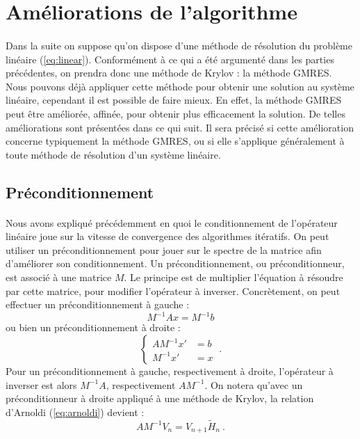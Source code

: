 \section{Améliorations de l’algorithme}

	\paragraph{}
	Dans la suite on suppose qu'on dispose d'une méthode de résolution du problème linéaire (\ref{eq:linear}).
	Conformément à ce qui a été argumenté dans les parties précédentes, on prendra donc une méthode de Krylov : la méthode GMRES.
	Nous pouvons déjà appliquer cette méthode pour obtenir une solution au système linéaire, cependant il est possible de faire mieux.
	En effet, la méthode GMRES peut être améliorée, affinée, pour obtenir plus efficacement la solution.
	De telles améliorations sont présentées dans ce qui suit.
	Il sera précisé si cette amélioration concerne typiquement la méthode GMRES, ou si elle s'applique généralement à toute méthode de résolution d'un système linéaire.


	\subsection{Préconditionnement}

		\paragraph{}
		Nous avons expliqué précédemment en quoi le conditionnement de l'opérateur linéaire joue sur la vitesse de convergence des algorithmes itératifs.
		On peut utiliser un préconditionnement pour jouer sur le spectre de la matrice afin d'améliorer son conditionnement.
		Un préconditionnement, ou préconditionneur, est associé à une matrice $M$.
		Le principe est de multiplier l'équation à résoudre par cette matrice, pour modifier l'opérateur à inverser.
		Concrètement, on peut effectuer un préconditionnement à gauche :
		\[M^{-1}Ax = M^{-1}b\]
		ou bien un préconditionnement à droite :
		\[\left\{\begin{aligned}AM^{-1}x' &= b \\	M^{-1}x' &= x\end{aligned}\right.\ .\]
		Pour un préconditionnement à gauche, respectivement à droite, l'opérateur à inverser est alors $M^{-1}A$, respectivement $AM^{-1}$.
    On notera qu'avec un préconditionneur à droite appliqué à une méthode de Krylov, la relation d'Arnoldi (\ref{eq:arnoldi}) devient :
    \begin{equation}\label{eq:arnoldi_pre}
      AM^{-1}V_n = V_{n+1}\widetilde{H}_n\ .
    \end{equation}

